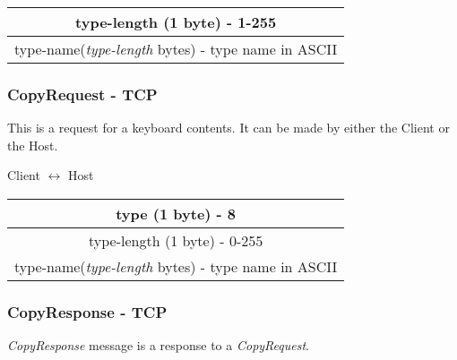 \documentclass{article}
\begin{document}
    \begin{center}
        \begin{tabular}{|c|}
            \hline
            type-length (1 byte) - 1-255                             \\
            \hline
            type-name(\emph{type-length} bytes) - type name in ASCII \\
            \hline
        \end{tabular}
    \end{center}

    \subsubsection{CopyRequest - TCP}

    This is a request for a keyboard contents. It can be made by either the Client or the Host.

    \begin{center}
        Client $\leftrightarrow$ Host\\
        \begin{tabular}{|c|}
            \hline
            type (1 byte) - 8                                        \\
            \hline
            type-length (1 byte) - 0-255                             \\
            \hline
            type-name(\emph{type-length} bytes) - type name in ASCII \\
            \hline
        \end{tabular}
    \end{center}

    \subsubsection{CopyResponse - TCP}

    \emph{CopyResponse} message is a response to a \emph{CopyRequest}.
\end{document}
